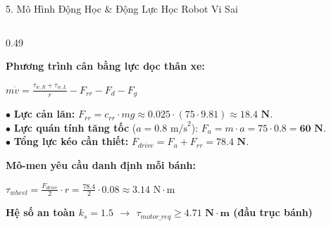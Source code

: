 \documentclass[aspectratio=169,9pt]{beamer}
\newcommand{\smallnote}[1]{{\fontsize{7.1}{8.4}\selectfont #1\par}}
\newcommand{\heading}[1]{{\bfseries\color{PTITRed} #1\par}}
\begin{document}
\begin{frame}{5. Mô Hình Động Học \& Động Lực Học Robot Vi Sai}
\begin{columns}[T,onlytextwidth]
    \begin{column}{0.49\textwidth}
      \begin{tcolorbox}[titlepanel,title=Động lực học \& Tính chọn động cơ (Dynamics)]
        \heading{Phương trình cân bằng lực dọc thân xe:}
        \vspace{-0.08cm}
        {\fontsize{7.8}{9.0}\selectfont
        \(\displaystyle m\dot{v} = \frac{\tau_{w,R} + \tau_{w,L}}{r} - F_{rr} - F_d - F_g\)\par}
        \vspace{0.06cm}
        \smallnote{$\bullet$ \textbf{Lực cản lăn:} $F_{rr} = c_{rr} \cdot mg \approx 0.025 \cdot (75 \cdot 9.81) \approx \mathbf{18.4\text{ N}}$.\\
        $\bullet$ \textbf{Lực quán tính tăng tốc} ($a = 0.8\text{ m/s}^2$): $F_a = m \cdot a = 75 \cdot 0.8 = \mathbf{60\text{ N}}$.\\
        $\bullet$ \textbf{Tổng lực kéo cần thiết:} $F_{drive} = F_a + F_{rr} = \mathbf{78.4\text{ N}}$.}
        \vspace{0.08cm}
        \heading{Mô-men yêu cầu danh định mỗi bánh:}
        \vspace{-0.08cm}
        {\fontsize{7.8}{9.0}\selectfont
        \(\displaystyle \tau_{wheel} = \frac{F_{drive}}{2} \cdot r = \frac{78.4}{2} \cdot 0.08 \approx 3.14\text{ N}\cdot\text{m}\)\par}
        \vspace{0.06cm}
        \begin{tcolorbox}[keypanel]
          \centering\bfseries\fontsize{7.6}{9.0}\selectfont
          Hệ số an toàn $k_s = 1.5$ $\rightarrow$ \(\boxed{\tau_{motor\_req} \ge \mathbf{4.71\text{ N}\cdot\text{m}}}\) (đầu trục bánh)
        \end{tcolorbox}
      \end{tcolorbox}
    \end{column}
  \end{columns}
\end{frame}
\end{document}

